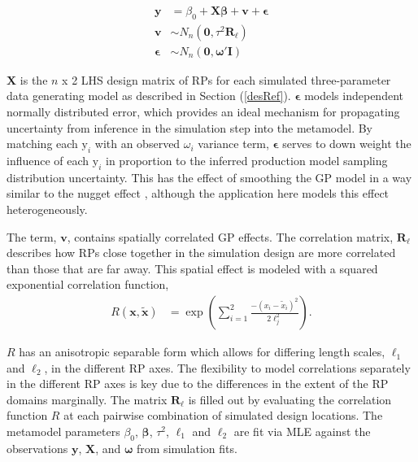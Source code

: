 %
\begin{align} \label{GPModel}
        \textbf{y} &= \beta_0 + \bm{X}\bm{\beta} + \bm{v} + \bm{\epsilon} \nonumber \\
        \bm{v} &\sim N_n(\bm{0}, \tau^2 \bm{R_{\ell}}) \\
        \bm{\epsilon} &\sim N_n(\bm{0}, \bm{\omega}'\bm{I}) \nonumber
\end{align}
%


$\bm{X}$ is the $n$ x 2 LHS design matrix of RPs for each simulated %
three-parameter data generating model as described in Section (\ref{desRef}).
$\bm{\epsilon}$ models independent normally distributed error, which provides an
ideal mechanism for propagating uncertainty from inference in the simulation
step into the metamodel. By matching each $\text{y}_i$ with an observed $\omega_i$
variance term, $\bm{\epsilon}$ serves to down weight the influence of each $\text{y}_i$
in proportion to the inferred production model sampling distribution
uncertainty. This has the effect of smoothing the GP model in a way similar to
the nugget effect \cite{gramacy_cases_2012}, although the application
here models this effect heterogeneously.

The term, $\bm{v}$, contains spatially correlated GP effects. The correlation
matrix, $\bm{R_{\ell}}$ describes how RPs close together in the simulation design
are more correlated than those that are far away. This spatial effect is modeled
with a squared exponential correlation function,
%
\begin{align}   \label{corModel}
R(\bm{x}, \bm{\tilde x}) &= \exp\left( \sum_{i=1}^2 \frac{-(x_{i}-\tilde x_{i})^2}{2\ell_j^2} \right).
\end{align}

$R$ has an anisotropic separable form which allows for differing length scales,
$\ell_1$ and $\ell_2$, in the different RP axes. The flexibility to model
correlations separately in the different RP axes is key due to the differences
in the extent of the RP domains marginally. The matrix $\bm{R_{\ell}}$ is filled 
out by evaluating the correlation function $R$ at each pairwise combination of 
simulated design locations.
The metamodel parameters $\beta_0$, $\bm{\beta}$, $\tau^2$,
$\ell_1$ and $\ell_2$ are fit via MLE against the observations $\textbf{y}$, $\bm{X}$,
and $\bm{\omega}$ from simulation fits.

